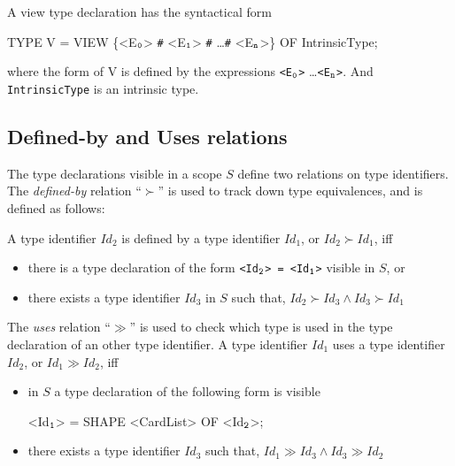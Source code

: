 A view type declaration has the syntactical form

\begin{frag}
TYPE V = VIEW \{<E$_{\tt 0}$>  \verb'#' <E$_{\tt 1}$>  \verb'#'
\ldots \verb'#'  <E$_{\tt n}$>\} OF IntrinsicType; 
\end{frag} 

\noindent where the form of \textsf{V} is defined by the expressions
{\tt <E$_{\tt 0}$>} \ldots {\tt <E$_{\tt n}$>}. And {\tt
IntrinsicType} is an intrinsic type.

\subsection*{Defined-by and Uses relations}

The type declarations visible in a scope $S$ define two relations on
type identifiers. The {\em defined-by} relation ``$\succ$'' is used to
track down type equivalences, and is defined as follows:

A type identifier $Id_2$ is defined by a type identifier $Id_1$, or
$Id_2 \succ Id_1$, iff

\begin{itemize}

\item there is a type declaration of the form {\tt <Id$_{\tt 2}$> =
<Id$_{\tt 1}$>}  visible in $S$, or

\item there exists a type identifier $Id_3$ in $S$ such that,
\(
Id_2 \succ Id_3 \wedge  Id_3 \succ Id_1
\)
\end{itemize}


The {\em uses} relation ``$\gg$'' is used to check which type is used
in the type declaration of an other type identifier. A type identifier
$Id_1$ uses a type identifier $Id_2$, or $Id_1 \gg Id_2$, iff

\begin{itemize}

\item in $S$ a type declaration of the following form is visible

\begin{frag}
<Id$_{\tt 1}$> =
SHAPE <CardList> OF <Id$_{\tt 2}$>;
\end{frag}

\item there exists a type identifier $Id_3$ such that,
\(
Id_1 \gg Id_3 \wedge  Id_3 \gg Id_2
\)
\end{itemize}

